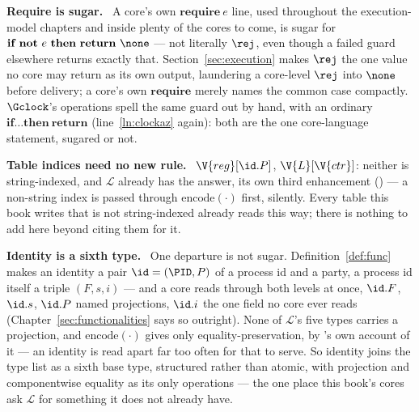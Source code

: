 \documentclass[10pt,oneside,openany]{book}
\newcommand{\heading}[1]{\medskip\par\noindent\textcolor{accent}{\textbf{#1.}}\ }
\theoremstyle{accentdef}
\theoremstyle{accentplain}
\begin{document}
\heading{Require is sugar} A core's own $\textbf{require}\ e$ line, used throughout the
execution-model chapters and inside plenty of the cores to come, is sugar for
$\textbf{if not}\ e\ \textbf{then}\ \textbf{return}\ \none$ --- not literally $\rej$, even though a
failed guard elsewhere returns exactly that. Section~\ref{sec:execution} makes $\rej$ the one
value no core may return as its own output, laundering a core-level $\rej$ into $\none$ before
delivery; a core's own $\textbf{require}$ merely names the common case compactly. $\Gclock$'s operations spell the same
guard out by hand, with an ordinary $\textbf{if}\dots\textbf{then}\ \textbf{return}$
(line~\ref{ln:clockaz} again): both are the one core-language statement, sugared or not.

\heading{Table indices need no new rule} $\V{reg}[\id.P]$, $\V{L}[\V{ctr}]$: neither is
string-indexed, and $\mathcal{L}$ already has the answer, its own third enhancement
(\cite{BR06}) --- a non-string index is passed through $\mathrm{encode}(\cdot)$ first, silently.
Every table this book writes that is not string-indexed already reads this way; there is nothing
to add here beyond citing them for it.

\heading{Identity is a sixth type} One departure is not sugar. Definition~\ref{def:func} makes an
identity a pair $\id = (\PID,P)$ of a process id and a party, a process id itself a triple
$(F,s,i)$ --- and a core reads through both levels at once, $\id.F$, $\id.s$, $\id.P$ named
projections, $\id.i$ the one field no core ever reads (Chapter~\ref{sec:functionalities} says so
outright). None of $\mathcal{L}$'s five types carries a projection, and $\mathrm{encode}(\cdot)$
gives only equality-preservation, by \cite{BR06}'s own account of it --- an identity is read
apart far too often for that to serve. So identity joins the type list as a sixth base type,
structured rather than atomic, with projection and componentwise equality as its only operations
--- the one place this book's cores ask $\mathcal{L}$ for something it does not already have.
\end{document}
